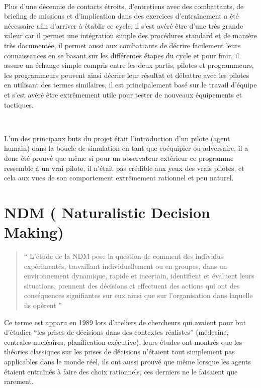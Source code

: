 ~\par
Plus d'une décennie de contacts étroits, d'entretiens avec des combattants, de briefing de missions et d'implication dans des exercices d'entraînement a été nécessaire afin d’arriver à établir ce cycle, il s’est avéré être d’une très grande valeur car il permet une intégration simple des procédures standard et de manière très documentée, il permet aussi aux combattants de décrire facilement leurs connaissances en se basant sur les différentes étapes du cycle et pour finir, il assure un échange simple compris entre les deux partis, pilotes et programmeurs, les programmeurs peuvent ainsi décrire leur résultat et débattre avec les pilotes en utilisant des termes similaires, il est principalement  basé sur le travail d’équipe et s’est avéré être extrêmement utile pour tester de nouveaux équipements et tactiques.

~\par
L’un des principaux buts du projet était  l’introduction d’un pilote (agent humain) dans la boucle de simulation en tant que coéquipier ou adversaire, il a donc été prouvé que même si pour un observateur extérieur ce programme ressemble à un vrai pilote, il n’était pas crédible aux yeux des vrais pilotes, et cela aux vues de son comportement extrêmement rationnel et peu naturel. \parencite{norling2000enhancing}


\section{NDM ( Naturalistic Decision Making)}

\begin{quotation}
“ L’étude de la NDM  pose la question de comment des individus expérimentés, travaillant individuellement ou en groupes, dans un environnement dynamique, rapide et incertain, identifient et évaluent leurs situations, prennent des décisions et effectuent des actions qui ont des conséquences signifiantes sur eux ainsi que sur l'organisation dans laquelle ils opèrent ” \parencite{zsambok2014naturalistic} \end{quotation} 



Ce terme est apparu en 1989 lors d’ateliers de chercheurs qui avaient pour but d’étudier 
“les prises de décisions dans des contextes réalistes” (médecine, centrales nucléaires, planification exécutive), leurs études ont montrés que les théories classiques sur les prises de décisions n’étaient tout simplement pas applicables dans le monde réel, ils ont aussi prouvé que même lorsque les agents étaient entraînés à faire des choix rationnels, ces derniers ne le faisaient que rarement.

